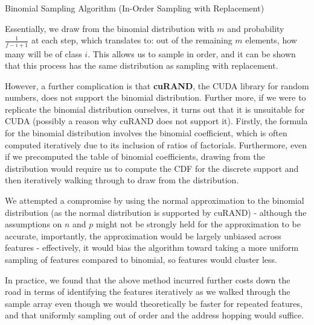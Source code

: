 \documentclass[10pt,conference]{IEEEtran}
\begin{document}
  \begin{algorithm}
  \caption{Binomial Sampling Algorithm (In-Order Sampling with Replacement)}
  \end{algorithm}

Essentially, we draw from the binomial distribution with $m$ and probability $\frac{1}{f-i+1}$ at each step, which translates to: out of the remaining $m$ elements, how many will be of class $i$. This allows us to sample in order, and it can be shown that this process has the same distribution as sampling with replacement.

However, a further complication is that \textbf{cuRAND}, the CUDA library for random numbers, does not support the binomial distribution. Further more, if we were to replicate the binomial distribution ourselves, it turns out that it is unsuitable for CUDA (possibly a reason why cuRAND does not support it). Firstly, the formula for the binomial distribution involves the binomial coefficient, which is often computed iteratively due to its inclusion of ratios of factorials. Furthermore, even if we precomputed the table of binomial coefficients, drawing from the distribution would require us to compute the CDF for the discrete support and then iteratively walking through to draw from the distribution. 

We attempted a compromise by using the normal approximation to the binomial distribution (as the normal distribution is supported by cuRAND) - although the assumptions on $n$ and $p$ might not be strongly held for the approximation to be accurate, importantly, the approximation would be largely unbiased across features - effectively, it would bias the algorithm toward taking a more uniform sampling of features compared to binomial, so features would cluster less. 

In practice, we found that the above method incurred further costs down the road in terms of identifying the features iteratively as we walked through the sample array even though we would theoretically be faster for repeated features, and that uniformly sampling out of order and the address hopping would suffice.
\end{document}

